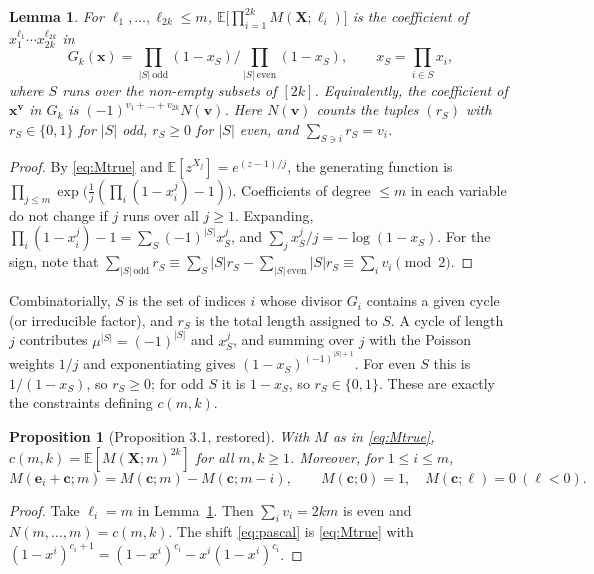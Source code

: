 \documentclass[11pt,a4paper]{amsart}
\newtheorem{lemma}[theorem]{Lemma}
\newtheorem{proposition}[theorem]{Proposition}
\theoremstyle{remark}
\newcommand{\bc}{\mathbf c}
\newcommand{\bX}{\mathbf X}
\newcommand{\E}{\mathbb E}
\begin{document}
\begin{lemma}\label{lem:gf}
For $\ell_1,\dots,\ell_{2k}\le m$, $\E\bigl[\prod_{i=1}^{2k}M(\bX;\ell_i)\bigr]$ is the coefficient of
$x_1^{\ell_1}\cdots x_{2k}^{\ell_{2k}}$ in
\[
G_k(\mathbf x)=\prod_{|S|\ \mathrm{odd}}(1-x_S)\Big/\prod_{|S|\ \mathrm{even}}(1-x_S),\qquad
x_S=\prod_{i\in S}x_i,
\]
where $S$ runs over the non-empty subsets of $[2k]$. Equivalently, the coefficient of
$\mathbf x^{\mathbf v}$ in $G_k$ is $(-1)^{v_1+\dots+v_{2k}}N(\mathbf v)$. Here $N(\mathbf v)$ counts the tuples $(r_S)$ with $r_S\in\{0,1\}$
for $|S|$ odd, $r_S\ge0$ for $|S|$ even, and $\sum_{S\ni i}r_S=v_i$.
\end{lemma}

\begin{proof}
By \eqref{eq:Mtrue} and $\E[z^{X_j}]=e^{(z-1)/j}$, the generating function is
$\prod_{j\le m}\exp\bigl(\frac1j(\prod_i(1-x_i^j)-1)\bigr)$. Coefficients of degree $\le m$ in each
variable do not change if $j$ runs over all $j\ge1$. Expanding,
$\prod_i(1-x_i^j)-1=\sum_S(-1)^{|S|}x_S^j$, and $\sum_j x_S^j/j=-\log(1-x_S)$. For the sign, note that
$\sum_{|S|\,\mathrm{odd}}r_S\equiv\sum_S|S|r_S-\sum_{|S|\,\mathrm{even}}|S|r_S\equiv\sum_iv_i\pmod 2$.
\end{proof}

Combinatorially, $S$ is the set of indices $i$ whose divisor $G_i$ contains a given cycle (or irreducible
factor), and $r_S$ is the total length assigned to $S$. A cycle of length $j$ contributes
$\mu^{|S|}=(-1)^{|S|}$ and $x_S^j$, and summing over $j$ with the Poisson weights $1/j$ and
exponentiating gives $(1-x_S)^{(-1)^{|S|+1}}$. For even $S$ this is $1/(1-x_S)$, so $r_S\ge0$; for odd
$S$ it is $1-x_S$, so $r_S\in\{0,1\}$. These are exactly the constraints defining $c(m,k)$.

\begin{proposition}[Proposition 3.1, restored]\label{prop:31}
With $M$ as in \eqref{eq:Mtrue}, $c(m,k)=\E[M(\bX;m)^{2k}]$ for all $m,k\ge1$. Moreover, for $1\le i\le m$,
\begin{equation}\label{eq:pascal}
M(\mathbf e_i+\bc;m)=M(\bc;m)-M(\bc;m-i),\qquad M(\bc;0)=1,\quad M(\bc;\ell)=0\ (\ell<0).
\end{equation}
\end{proposition}

\begin{proof}
Take $\ell_i=m$ in Lemma~\ref{lem:gf}. Then $\sum_iv_i=2km$ is even and $N(m,\dots,m)=c(m,k)$. The shift
\eqref{eq:pascal} is \eqref{eq:Mtrue} with $(1-x^i)^{c_i+1}=(1-x^i)^{c_i}-x^i(1-x^i)^{c_i}$.
\end{proof}
\end{document}
